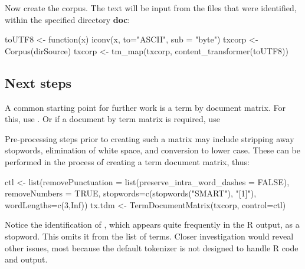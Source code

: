 Now create the corpus.  The text will be input from the files that
were identified, within the specified directory {\bf doc}:
\begin{Schunk}
\begin{Sinput}
toUTF8 <- function(x) iconv(x, to="ASCII",
                            sub = "byte")
txcorp <- Corpus(dirSource)
txcorp <- tm_map(txcorp,
     content_transformer(toUTF8))
\end{Sinput}
\end{Schunk}

\subsection*{Next steps}

A common starting point for further work is a term by document matrix.
For this, use .  Or if a
document by term matrix is required, use 

Pre-processing steps prior to creating such a matrix may include
stripping away stopwords, elimination of white space, and conversion
to lower case.  These can be performed in the process of creating a
term document matrix, thus:
\begin{fullwidth}
\begin{Schunk}
\begin{Sinput}
ctl <- list(removePunctuation = list(preserve_intra_word_dashes = FALSE),
            removeNumbers = TRUE, 
            stopwords=c(stopwords("SMART"), "[1]"),
            wordLengths=c(3,Inf))
tx.tdm <- TermDocumentMatrix(txcorp, control=ctl)
\end{Sinput}
\end{Schunk}
\end{fullwidth}
\noindent
Notice the identification of \txtt{[1]}, which appears quite
frequently in the R output, as a stopword.  This omits it from the
list of terms.  Closer investigation would reveal other issues, most
because the default tokenizer is not designed to handle
R code and output.

